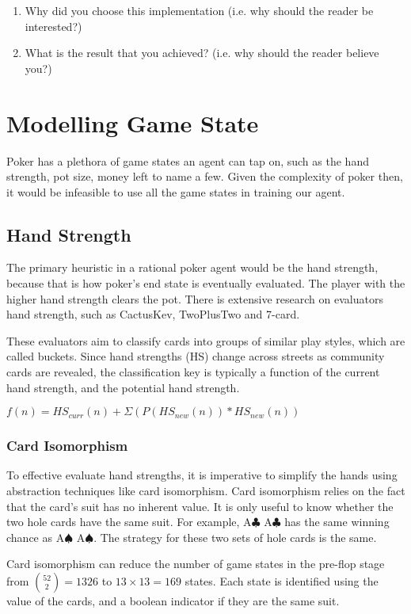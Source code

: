 \documentclass{article}
\begin{document}
\begin{enumerate}
	\item Why did you choose this implementation (i.e. why should the reader be interested?)
	\item What is the result that you achieved? (i.e. why should the reader believe you?)
\end{enumerate}

\section{Modelling Game State}
Poker has a plethora of game states an agent can tap on, such as the hand strength, pot size, money left to name a few. Given the complexity of poker then, it would be infeasible to use all the game states in training our agent.

\subsection{Hand Strength}
The primary heuristic in a rational poker agent would be the hand strength, because that is how poker's end state is eventually evaluated. The player with the higher hand strength clears the pot. There is extensive research on evaluators hand strength, such as CactusKev, TwoPlusTwo and 7-card.

These evaluators aim to classify cards into groups of similar play styles, which are called buckets. Since hand strengths (HS) change across streets as community cards are revealed, the classification key is typically a function of the current hand strength, and the potential hand strength.

$f(n) = HS_{curr}(n) + \Sigma(P(HS_{new}(n)) * HS_{new}(n))$

\subsubsection{Card Isomorphism}
To effective evaluate hand strengths, it is imperative to simplify the hands using abstraction techniques like card isomorphism. Card isomorphism relies on the fact that the card's suit has no inherent value. It is only useful to know whether the two hole cards have the same suit. For example, A$\clubsuit$ A$\clubsuit$ has the same winning chance as A$\spadesuit$ A$\spadesuit$. The strategy for these two sets of hole cards is the same.

Card isomorphism can reduce the number of game states in the pre-flop stage from ${52 \choose 2} = 1326$ to $13 \times 13 = 169$ states. Each state is identified using the value of the cards, and a boolean indicator if they are the same suit.
\end{document}
